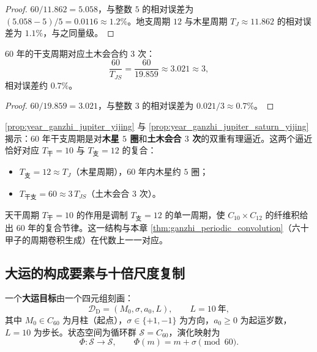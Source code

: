 \begin{proof}
$60/11.862=5.058$，与整数 $5$ 的相对误差为 $(5.058-5)/5=0.0116\approx 1.2\%$。地支周期 $12$ 与木星周期 $T_J\approx 11.862$ 的相对误差为 $1.1\%$，与之同量级。
\end{proof}

\begin{proposition}[年干支对土木会合的逼近]\label{prop:year_ganzhi_jupiter_saturn_yijing}
$60$ 年的干支周期对应土木会合约 $3$ 次：
\[
\frac{60}{T_{JS}}=\frac{60}{19.859}\approx 3.021\approx 3,
\]
相对误差约 $0.7\%$。
\end{proposition}

\begin{proof}
$60/19.859=3.021$，与整数 $3$ 的相对误差为 $0.021/3\approx 0.7\%$。
\end{proof}

\begin{remark}[年干支作为双重逼近]\label{rem:ganzhi_double_approximation_yijing}
\cref{prop:year_ganzhi_jupiter_yijing} 与 \cref{prop:year_ganzhi_jupiter_saturn_yijing} 揭示：$60$ 年干支周期是对\textbf{木星 $5$ 圈}和\textbf{土木会合 $3$ 次}的双重有理逼近。这两个逼近恰好对应 $T_{\text{干}}=10$ 与 $T_{\text{支}}=12$ 的复合：
\begin{itemize}
    \item $T_{\text{支}}=12\approx T_J$（木星周期），$60$ 年内木星约 $5$ 圈；
    \item $T_{\text{干支}}=60\approx 3\,T_{JS}$（土木会合 $3$ 次）。
\end{itemize}
天干周期 $T_{\text{干}}=10$ 的作用是调制 $T_{\text{支}}=12$ 的单一周期，使 $C_{10}\times C_{12}$ 的纤维积给出 $60$ 年的复合节律。这一结构与本章 \cref{thm:ganzhi_periodic_convolution}（六十甲子的周期卷积生成）在代数上一一对应。
\end{remark}

\subsection{大运的构成要素与十倍尺度复制}

\begin{definition}[大运目标与判定输入]\label{def:dayun_target_yijing}
一个\textbf{大运目标}由一个四元组刻画：
\[
\mathcal D_{\mathrm{D}}=(M_0,\sigma,a_0,L),\qquad L=10\ \text{年},
\]
其中 $M_0\in C_{60}$ 为月柱（起点），$\sigma\in\{+1,-1\}$ 为方向，$a_0\ge 0$ 为起运岁数，$L=10$ 为步长。状态空间为循环群 $\mathcal S=C_{60}$，演化映射为
\[
\Phi:\mathcal S\to\mathcal S,\qquad \Phi(m)=m+\sigma\pmod{60}.
\]
\end{definition}

